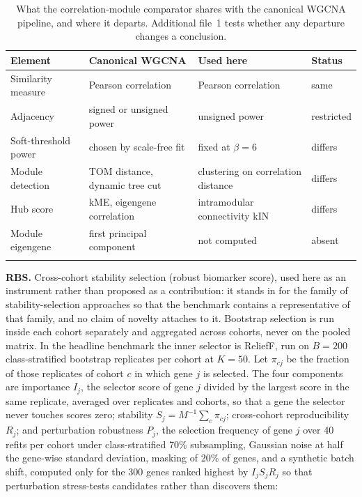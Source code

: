 \documentclass[pdflatex,sn-vancouver-num]{sn-jnl}
\theoremstyle{thmstyleone}
\theoremstyle{thmstyletwo}
\theoremstyle{thmstylethree}
\begin{document}
\begin{table}[h]
\caption{What the correlation-module comparator shares with the canonical WGCNA pipeline, and where it departs. Additional file~1 tests whether any departure changes a conclusion.}\label{tab:comparator}
\footnotesize
\setlength{\tabcolsep}{4pt}
\begin{tabular}{@{}p{24mm}p{41mm}p{41mm}p{15mm}@{}}
\toprule
Element & Canonical WGCNA & Used here & Status \\
\midrule
Similarity measure & Pearson correlation & Pearson correlation & same \\
Adjacency & signed or unsigned power & unsigned power & restricted \\
Soft-threshold power & chosen by scale-free fit & fixed at $\beta = 6$ & differs \\
Module detection & TOM distance, dynamic tree cut & clustering on correlation distance & differs \\
Hub score & kME, eigengene correlation & intramodular connectivity kIN & differs \\
Module eigengene & first principal component & not computed & absent \\
\botrule
\end{tabular}
\end{table}

\textbf{RBS.} Cross-cohort stability selection (robust biomarker score), used here as an instrument rather than
proposed as a contribution: it stands in for the family of stability-selection approaches
\cite{meinshausen2010} so that the benchmark contains a representative of that family, and no
claim of novelty attaches to it. Bootstrap selection is run inside each cohort separately and
aggregated across cohorts, never on the pooled matrix. In the headline benchmark the inner selector is ReliefF, run on $B = 200$ class-stratified bootstrap replicates per cohort at $K = 50$. Let $\pi_{cj}$ be the fraction of those replicates of cohort $c$ in which gene $j$ is selected. The four components are importance $I_j$, the selector score of gene $j$ divided by the largest score in the same replicate, averaged over replicates and cohorts, so that a gene the selector never touches scores zero; stability $S_j = M^{-1} \sum_c \pi_{cj}$; cross-cohort reproducibility $R_j$; and perturbation robustness $P_j$, the selection frequency of gene $j$ over 40 refits per cohort under class-stratified 70\% subsampling, Gaussian noise at half the gene-wise standard deviation, masking of 20\% of genes, and a synthetic batch shift, computed only for the 300 genes ranked highest by $I_j S_j R_j$ so that perturbation stress-tests candidates rather than discovers them:
\end{document}
